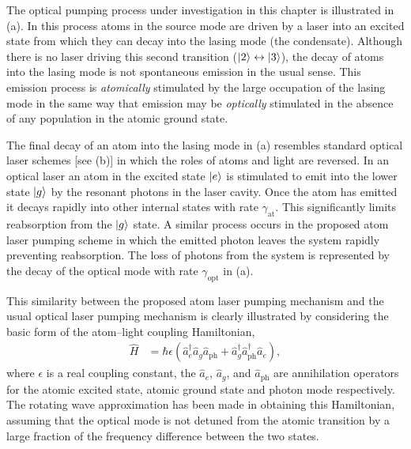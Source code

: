 The optical pumping process under investigation in this chapter is illustrated in (a).  In this process atoms in the source mode are driven by a laser into an excited state from which they can decay into the lasing mode (the condensate).  Although there is no laser driving this second transition (${\left|2\right>}\leftrightarrow{\ensuremath{\left|3\right>}}$), the decay of atoms into the lasing mode is not spontaneous emission in the usual sense.  This emission process is \emph{atomically} stimulated by the large occupation of the lasing mode in the same way that emission may be \emph{optically} stimulated in the absence of any population in the atomic ground state.

The final decay of an atom into the lasing mode in (a) resembles standard optical laser schemes [see (b)] in which the roles of atoms and light are reversed.  In an optical laser an atom in the excited state ${\left|e\right>}$ is stimulated to emit into the lower state ${\left|g\right>}$ by the resonant photons in the laser cavity.  Once the atom has emitted it decays rapidly into other internal states with rate $\gamma_\text{at}$. This significantly limits reabsorption from the ${\left|g\right>}$ state.  A similar process occurs in the proposed atom laser pumping scheme in which the emitted photon leaves the system rapidly preventing reabsorption.  The loss of photons from the system is represented by the decay of the optical mode with rate $\gamma_\text{opt}$ in (a).

This similarity between the proposed atom laser pumping mechanism and the usual optical laser pumping mechanism is clearly illustrated by considering the basic form of the atom--light coupling Hamiltonian,
\begin{align}
    \hat{H} &= \hbar \epsilon \left(\hat{a}_e^\dagger \hat{a}_g \hat{a}_\text{ph} + \hat{a}_g^\dagger \hat{a}_\text{ph}^\dagger \hat{a}_e  \right),
    \label{OpticalPumping:TwoLevelAtomHamiltonian}
\end{align}
where $\epsilon$ is a real coupling constant, the $\hat{a}_e$, $\hat{a}_g$, and $\hat{a}_\text{ph}$ are annihilation operators for the atomic excited state, atomic ground state and photon mode respectively.  The rotating wave approximation has been made in obtaining this Hamiltonian, assuming that the optical mode is not detuned from the atomic transition by a large fraction of the frequency difference between the two states.  

